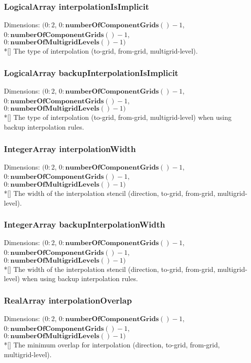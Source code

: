 \documentclass{article}
\begin{document}
  \subsubsection{LogicalArray interpolationIsImplicit}
  \label{CompositeGrid::interpolationIsImplicit}
    Dimensions: $(0\colon2$, $0\colon\textbf{numberOfComponentGrids}()-1$, $0\colon\textbf{numberOfComponentGrids}()-1$, $0\colon\textbf{numberOfMultigridLevels}()-1)$ \\*[\parskip]
    The type of interpolation (to-grid, from-grid, multigrid-level).

  \subsubsection{LogicalArray backupInterpolationIsImplicit}
  \label{CompositeGrid::backupInterpolationIsImplicit}
    Dimensions: $(0\colon2$, $0\colon\textbf{numberOfComponentGrids}()-1$, $0\colon\textbf{numberOfComponentGrids}()-1$, $0\colon\textbf{numberOfMultigridLevels}()-1)$ \\*[\parskip]
    The type of interpolation (to-grid, from-grid, multigrid-level) when using backup interpolation rules.

  \subsubsection{IntegerArray interpolationWidth}
  \label{CompositeGrid::interpolationWidth}
    Dimensions: $(0\colon2$, $0\colon\textbf{numberOfComponentGrids}()-1$, $0\colon\textbf{numberOfComponentGrids}()-1$, $0\colon\textbf{numberOfMultigridLevels}()-1)$ \\*[\parskip]
    The width of the interpolation stencil (direction, to-grid, from-grid, multigrid-level).

  \subsubsection{IntegerArray backupInterpolationWidth}
  \label{CompositeGrid::backupInterpolationWidth}
    Dimensions: $(0\colon2$, $0\colon\textbf{numberOfComponentGrids}()-1$, $0\colon\textbf{numberOfComponentGrids}()-1$, $0\colon\textbf{numberOfMultigridLevels}()-1)$ \\*[\parskip]
    The width of the interpolation stencil (direction, to-grid, from-grid, multigrid-level) when using backup interpolation rules.

  \subsubsection{RealArray interpolationOverlap}
  \label{CompositeGrid::interpolationOverlap}
    Dimensions: $(0\colon2$, $0\colon\textbf{numberOfComponentGrids}()-1$, $0\colon\textbf{numberOfComponentGrids}()-1$, $0\colon\textbf{numberOfMultigridLevels}()-1)$ \\*[\parskip]
    The minimum overlap for interpolation (direction, to-grid, from-grid, multigrid-level).
\end{document}
